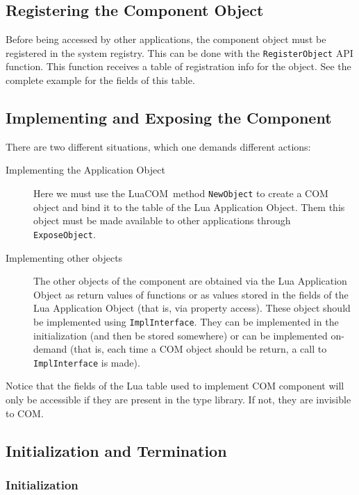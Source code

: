 \documentclass[11pt,a4paper,english]{report}
\newcommand{\techname}[1]{\mbox{#1}}
\newcommand{\luacom}{\techname{LuaCOM}}
\begin{document}
\subsection{Registering the Component Object}

Before being accessed by other applications, the component object must
be registered in the system registry. This can be done with the \verb+RegisterObject+ API function.
This function receives a table of registration info for
the object. See the complete example for the fields of this table.



\subsection{Implementing and Exposing the Component}

There are two different situations, which one demands different
actions:

\begin{description}
\item [Implementing the Application Object] Here we must use the
\luacom\ method \verb+NewObject+ to create a COM object and
bind it to the table of the Lua Application Object. Them this object must
be made available to other applications through \verb+ExposeObject+.

\item [Implementing other objects] The other objects of the component
are obtained via the Lua Application Object as return values of
functions or as values stored in the fields of the Lua Application
Object (that is, via property access). These object should be
implemented using \verb+ImplInterface+. They can be implemented
in the initialization (and then be stored somewhere) or can be
implemented on-demand (that is, each time a COM object should be
return, a call to \verb+ImplInterface+ is made).
\end{description}

Notice that the fields of the Lua table used to implement COM
component will only be accessible if they are present in the type
library. If not, they are invisible to COM.


\subsection{Initialization and Termination}

\subsubsection*{Initialization}
\end{document}
